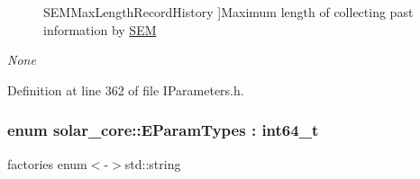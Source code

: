 \begin{Desc}
\begin{description}
{\hypertarget{namespacesolar__core_ac827fdef4412a3c0d5e44d3f31908e49ac75cfee3c5e5c1d3c4b15f53ab4cc718}{}S\+E\+M\+Max\+Length\+Record\+History\label{namespacesolar__core_ac827fdef4412a3c0d5e44d3f31908e49ac75cfee3c5e5c1d3c4b15f53ab4cc718}
}]Maximum length of collecting past information by \hyperlink{classsolar__core_1_1_s_e_m}{S\+E\+M} \item[{\em 
\hypertarget{namespacesolar__core_ac827fdef4412a3c0d5e44d3f31908e49a6adf97f83acf6453d4a6a4b1070f3754}{}None\label{namespacesolar__core_ac827fdef4412a3c0d5e44d3f31908e49a6adf97f83acf6453d4a6a4b1070f3754}
}]\end{description}
\end{Desc}


Definition at line 362 of file I\+Parameters.\+h.

\hypertarget{namespacesolar__core_aa1147341e5ef7a40d68d1bd68e149362}{}
\subsubsection[{E\+Param\+Types}]{\setlength{\rightskip}{0pt plus 5cm}enum {\bf solar\+\_\+core\+::\+E\+Param\+Types} \+: int64\+\_\+t\hspace{0.3cm}{\ttfamily [strong]}}\label{namespacesolar__core_aa1147341e5ef7a40d68d1bd68e149362}
factories enum$<$-\/$>$std\+::string

